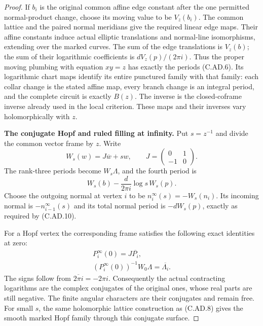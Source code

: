 \begin{proof}
If $b_i$ is the original common affine edge constant after
the one permitted normal-product change, choose its moving
value to be $V_z(b_i)$. The common lattice and the paired
normal meridians give the required linear edge maps. Their
affine constants induce actual elliptic translations and
normal-line isomorphisms, extending over the marked curves.
The sum of the edge translations is $V_z(b)$; the sum of
their logarithmic coefficients is $dV_z(p)/(2\pi i)$.
Thus the proper moving plumbing with equation $xy=z$ has
exactly the periods (C.AD.6). Its logarithmic chart maps
identify its entire punctured family with that family:
each collar change is the stated affine map, every branch
change is an integral period, and the complete circuit is
exactly $B(z)$. The inverse is the closed-coframe inverse
already used in the local criterion. These maps and their
inverses vary holomorphically with $z$.

\par\medskip\noindent\textbf{The conjugate Hopf and ruled filling at infinity.}
Put $s=z^{-1}$ and divide the common vector frame by $z$.
Write
\[
 W_s(w)=J\overline w+s w,\qquad
              J=\begin{pmatrix}0&1\\-1&0\end{pmatrix}.
                                                        \tag{C.AD.9}
\]
The rank-three periods become $W_s\Lambda$, and the fourth
period is
\[
                 W_s(b)-\frac{d}{2\pi i}\log s\,W_s(p).
                                                        \tag{C.AD.10}
\]
Choose the outgoing normal at vertex $i$ to be
$n_i^\infty(s)=-W_s(n_i)$. Its incoming normal is
$-n_{i-1}^\infty(s)$ and its total normal period is
$-dW_s(p)$, exactly as required by (C.AD.10).

For a Hopf vertex the corresponding frame satisfies the
following exact identities at zero:
\[
 \begin{gathered}
 P_i^\infty(0)=J\overline{P_i},\\
 (P_i^\infty(0))^{-1}W_0\Lambda
                         =\overline{\Lambda_i}.
 \end{gathered}                                        \tag{C.AD.11}
\]
The signs follow from $\overline{2\pi i}=-2\pi i$.
Consequently the actual contracting logarithms are the
complex conjugates of the original ones, whose real parts
are still negative. The finite angular characters are
their conjugates and remain free. For small $s$, the same
holomorphic lattice construction as (C.AD.8) gives the
smooth marked Hopf family through this conjugate surface.


\end{proof}
